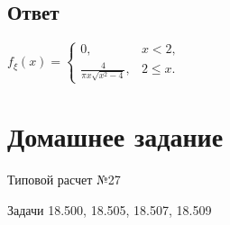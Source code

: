 \documentclass[12pt,a4paper]{article}
\begin{document}
    \subsection*{Ответ}
    $
    f_\xi(x)
    = \left \{
    \begin{array}{ll}
        0,                              & x < 2 ,   \\
        \frac{4}{\pi x \sqrt{x^2 - 4}}, & 2 \le x .
    \end{array}
    \right .
    $


    \section{Домашнее задание}
    Типовой расчет №27

    Задачи 18.500, 18.505, 18.507, 18.509
\end{document}
